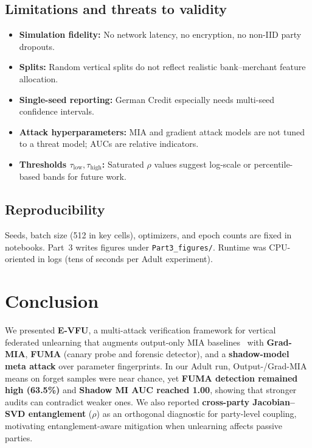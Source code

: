 \documentclass[sigconf,nonacm]{acmart}
\begin{document}
\subsection{Limitations and threats to validity}
\begin{itemize}[leftmargin=*]
  \item \textbf{Simulation fidelity:} No network latency, no encryption, no non-IID party dropouts.
  \item \textbf{Splits:} Random vertical splits do not reflect realistic bank--merchant feature allocation.
  \item \textbf{Single-seed reporting:} German Credit especially needs multi-seed confidence intervals.
  \item \textbf{Attack hyperparameters:} MIA and gradient attack models are not tuned to a threat model; AUCs are relative indicators.
  \item \textbf{Thresholds $\tau_{\mathrm{low}},\tau_{\mathrm{high}}$:} Saturated $\rho$ values suggest log-scale or percentile-based bands for future work.
\end{itemize}

\subsection{Reproducibility}
Seeds, batch size (512 in key cells), optimizers, and epoch counts are fixed in notebooks. Part~3 writes figures under \texttt{Part3\_figures/}. Runtime was CPU-oriented in logs (tens of seconds per Adult experiment).

\section{Conclusion}
\label{sec:conclusion}
We presented \textbf{E-VFU}, a multi-attack verification framework for vertical federated unlearning that augments output-only MIA baselines~\cite{varshney2025vfu} with \textbf{Grad-MIA}, \textbf{FUMA} (canary probe and forensic detector), and a \textbf{shadow-model meta attack} over parameter fingerprints. In our Adult run, Output-/Grad-MIA means on forget samples were near chance, yet \textbf{FUMA detection remained high (63.5\%)} and \textbf{Shadow MI AUC reached 1.00}, showing that stronger audits can contradict weaker ones. We also reported \textbf{cross-party Jacobian--SVD entanglement} ($\rho$) as an orthogonal diagnostic for party-level coupling, motivating entanglement-aware mitigation when unlearning affects passive parties.
\end{document}

